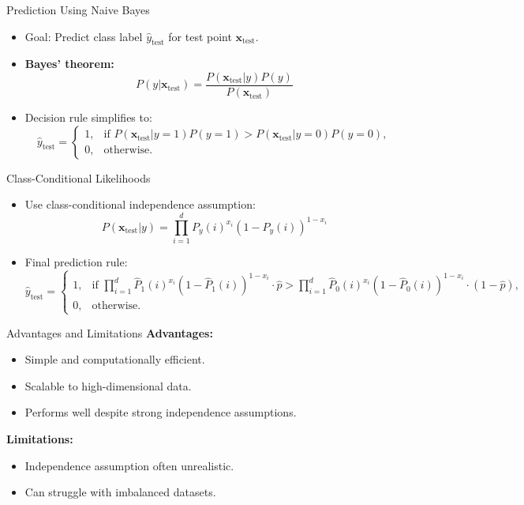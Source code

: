 \begin{frame}{Prediction Using Naive Bayes}
    \begin{itemize}
        \item Goal: Predict class label $\hat{y}_{\text{test}}$ for test point $\mathbf{x}_{\text{test}}$.
        \item \textbf{Bayes' theorem:}
        \[
        P(y | \mathbf{x}_{\text{test}}) = \frac{P(\mathbf{x}_{\text{test}} | y) P(y)}{P(\mathbf{x}_{\text{test}})}
        \]
        \item Decision rule simplifies to:
        \[
        \hat{y}_{\text{test}} =
        \begin{cases}
        1, & \text{if } P(\mathbf{x}_{\text{test}} | y=1) P(y=1) > P(\mathbf{x}_{\text{test}} | y=0) P(y=0), \\
        0, & \text{otherwise.}
        \end{cases}
        \]
    \end{itemize}
\end{frame}

\begin{frame}{Class-Conditional Likelihoods}
    \begin{itemize}
        \item Use class-conditional independence assumption:
        \[
        P(\mathbf{x}_{\text{test}} | y) = \prod_{i=1}^d P_y(i)^{x_i} (1 - P_y(i))^{1 - x_i}
        \]
        \item Final prediction rule:
        \[
        \hat{y}_{\text{test}} =
        \begin{cases}
        1, & \text{if } \prod_{i=1}^d \hat{P}_1(i)^{x_i} (1 - \hat{P}_1(i))^{1 - x_i} \cdot \hat{p} > \prod_{i=1}^d \hat{P}_0(i)^{x_i} (1 - \hat{P}_0(i))^{1 - x_i} \cdot (1 - \hat{p}), \\
        0, & \text{otherwise.}
        \end{cases}
        \]
    \end{itemize}
\end{frame}

\begin{frame}{Advantages and Limitations}
    \textbf{Advantages:}
    \begin{itemize}
        \item Simple and computationally efficient.
        \item Scalable to high-dimensional data.
        \item Performs well despite strong independence assumptions.
    \end{itemize}
    \vspace{0.5cm}
    \textbf{Limitations:}
    \begin{itemize}
        \item Independence assumption often unrealistic.
        \item Can struggle with imbalanced datasets.
    \end{itemize}
\end{frame}

